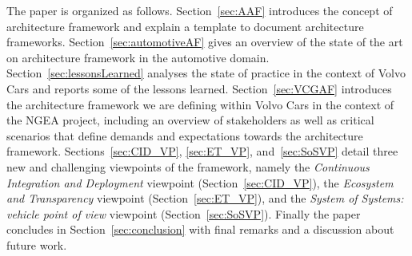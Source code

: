 \documentclass[preprint,12pt,3p]{elsarticle}
\newcommand\eric[1]{\nb{Eric}{#1}}
\begin{document}
The paper is organized as follows. Section~\ref{sec:AAF} introduces the concept of architecture framework and explain a template to document architecture frameworks. Section~\ref{sec:automotiveAF} gives an overview of 
 the state of the art on architecture framework in the automotive domain. Section~\ref{sec:lessonsLearned} analyses the state of practice in the context of Volvo Cars and reports some of the lessons learned. 
 Section~\ref{sec:VCGAF} introduces the architecture framework we are defining within Volvo Cars in the context of the NGEA project, including an overview of stakeholders as well as critical scenarios that define demands and expectations towards the architecture framework. %
 Sections~\ref{sec:CID_VP}, \ref{sec:ET_VP}, and~\ref{sec:SoSVP} detail three new and challenging viewpoints of the framework, namely the {\em Continuous Integration and Deployment} viewpoint (Section~\ref{sec:CID_VP}), the {\em Ecosystem and Transparency} viewpoint (Section~\ref{sec:ET_VP}), and the {\em System of Systems: vehicle point of view} viewpoint (Section~\ref{sec:SoSVP}).
Finally the paper concludes in Section~\ref{sec:conclusion} with final remarks and a discussion about future work. 










% 
% 
% 
% 
% 
% 
% 
% 
% 
% 
% 
% 


\end{document}
